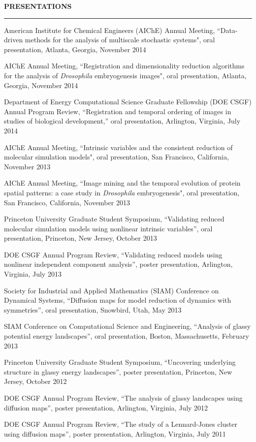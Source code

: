 \documentclass[letterpaper,10pt]{article}
\newenvironment{itemize*}
  {\begin{itemize}
    \setlength{\parskip}{-2pt}}
  {\end{itemize}}
\newcommand{\cvheading}[1]{
\vspace{0.11in}
\noindent
\MakeUppercase{\bf #1}
\vspace{0.06in}
{\hrule height 0.3mm}
\vspace{0.06in}}
\begin{document}
\cvheading{Presentations}
\begin{itemize*}
\item American Institute for Chemical Engineers (AIChE) Annual Meeting,  ``Data-driven methods for the analysis of multiscale stochastic systems", oral presentation, Atlanta, Georgia, November 2014
\item AIChE Annual Meeting,  ``Registration and dimensionality reduction algorithms for the analysis of {\em Drosophila} embryogenesis images", oral presentation, Atlanta, Georgia, November 2014
\item Department of Energy Computational Science Graduate Fellowship (DOE CSGF) Annual Program Review, ``Registration and temporal ordering of images in studies of biological development,'' oral presentation, Arlington, Virginia, July 2014
\item AIChE Annual Meeting,  ``Intrinsic variables and the consistent reduction of molecular simulation models", oral presentation, San Francisco, California, November 2013
\item AIChE Annual Meeting,  ``Image mining and the temporal evolution of protein spatial patterns: a case study in {\it Drosophila} embryogenesis", oral presentation, San Francisco, California, November 2013
\item Princeton University Graduate Student Symposium, ``Validating reduced molecular simulation models using nonlinear intrinsic variables'', oral presentation, Princeton, New Jersey, October 2013
\item DOE CSGF Annual Program Review, ``Validating reduced models using nonlinear independent component analysis'', poster presentation, Arlington, Virginia, July 2013
\item Society for Industrial and Applied Mathematics (SIAM) Conference on Dynamical Systems, ``Diffusion maps for model reduction of dynamics with symmetries'', oral presentation, Snowbird, Utah, May 2013
\item SIAM Conference on Computational Science and Engineering, ``Analysis of glassy potential energy landscapes'', oral presentation, Boston, Massachusetts, February 2013
\item Princeton University Graduate Student Symposium, ``Uncovering underlying structure in glassy energy landscapes'', poster presentation, Princeton, New Jersey, October 2012
\item DOE CSGF Annual Program Review, ``The analysis of glassy landscapes using diffusion maps'', poster presentation, Arlington, Virginia, July 2012
\item DOE CSGF Annual Program Review, ``The study of a Lennard-Jones cluster using diffusion maps'', poster presentation, Arlington, Virginia, July 2011
\end{itemize*}
\end{document}
